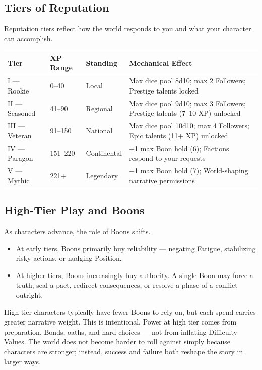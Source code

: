 \subsection{Tiers of Reputation}

Reputation tiers reflect how the world responds to you and what your character can accomplish.

\begin{tabular}{@{}llll@{}}
\toprule
\textbf{Tier} & \textbf{XP Range} & \textbf{Standing} & \textbf{Mechanical Effect} \\
\midrule
I --- Rookie & 0--40 & Local & Max dice pool 8d10; max 2 Followers; Prestige talents locked \\
II --- Seasoned & 41--90 & Regional & Max dice pool 9d10; max 3 Followers; Prestige talents (7--10 XP) unlocked \\
III --- Veteran & 91--150 & National & Max dice pool 10d10; max 4 Followers; Epic talents (11+ XP) unlocked \\
IV --- Paragon & 151--220 & Continental & +1 max Boon hold (6); Factions respond to your requests \\
V --- Mythic & 221+ & Legendary & +1 max Boon hold (7); World-shaping narrative permissions \\
\bottomrule
\end{tabular}

\subsection{High-Tier Play and Boons}

As characters advance, the role of Boons shifts.
\begin{itemize}
  \item At early tiers, Boons primarily buy reliability --- negating Fatigue, stabilizing risky actions, or nudging Position.
  \item At higher tiers, Boons increasingly buy authority. A single Boon may force a truth, seal a pact, redirect consequences, or resolve a phase of a conflict outright.
\end{itemize}

High-tier characters typically have fewer Boons to rely on, but each spend carries greater narrative weight. This is intentional. Power at high tier comes from preparation, Bonds, oaths, and hard choices --- not from inflating Difficulty Values. The world does not become harder to roll against simply because characters are stronger; instead, success and failure both reshape the story in larger ways.

